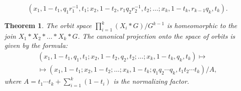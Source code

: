 \documentclass[10pt,a4paper]{amsart}
\newtheorem{thm}{Theorem}
\begin{document}
\begin{equation}\label{eqCodiagonalAcn}
(x_1,1-t_1, q_1r_1^{-1},t_1; x_2,1-t_2, r_1q_2r_2^{-1},t_2; \ldots; x_k,1-t_k, r_{k-1}q_k,t_k).
\end{equation}

\begin{thm}\label{thmJoins}
The orbit space $\prod_{i=1}^{k}(X_i\ast G)/G^{k-1}$ is homeomorphic to the join
$X_1\ast X_2\ast \ldots\ast X_k\ast G$. The canonical projection onto the space of orbits is given by the formula:
\begin{multline}\label{eqJoinMap}
(x_1,1-t_1, q_1,t_1; x_2,1-t_2, q_2,t_2; \ldots; x_k,1-t_k, q_k,t_k) \mapsto \\
\mapsto (x_1,1-t_1;x_2,1-t_2;\ldots; x_k,1-t_k; q_1q_2\cdots q_k, t_1t_2\cdots t_k)/A,
\end{multline}
where $A=t_1\cdots t_k+\sum\nolimits_{i=1}^{k}(1-t_i)$ is the normalizing factor.
\end{thm}
\end{document}

